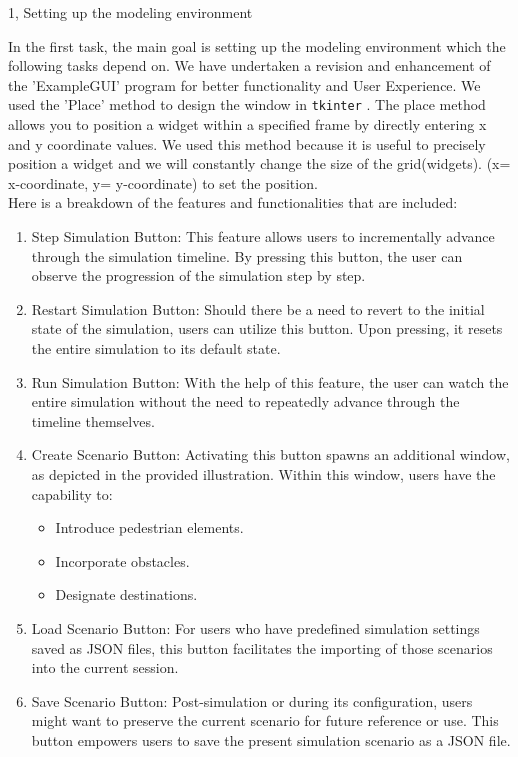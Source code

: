 \documentclass[10pt,a4paper]{article}
\begin{document}
\frontpage

\begin{task}{1, Setting up the modeling environment}

In the first task, the main goal is setting up the modeling environment which the following tasks depend on. 
We have undertaken a revision and enhancement of the 'ExampleGUI' program for better functionality and User Experience. 
We used the 'Place' method to design the window in \verb|tkinter| \cite{tkinter}. The place method allows you to position a widget within a specified frame by directly entering x and y coordinate values. We used this method because it is useful to precisely position a widget and we will constantly change the size of the grid(widgets). (x= x-coordinate, y= y-coordinate) to set the position.\\

Here is a breakdown of the features and functionalities that are included:

\begin{enumerate}
  \item Step Simulation Button: This feature allows users to incrementally advance through the simulation timeline. By pressing this button, the user can observe the progression of the simulation step by step.
  \item Restart Simulation Button: Should there be a need to revert to the initial state of the simulation, users can utilize this button. Upon pressing, it resets the entire simulation to its default state.
  \item Run Simulation Button: With the help of this feature, the user can watch the entire simulation without the need to repeatedly advance through the timeline themselves.  
  \item Create Scenario Button: Activating this button spawns an additional window, as depicted in the provided illustration. Within this window, users have the capability to:
  \begin{itemize}
      \item Introduce pedestrian elements.
      \item Incorporate obstacles.
      \item Designate destinations.
  \end{itemize}
  \item Load Scenario Button: For users who have predefined simulation settings saved as JSON files, this button facilitates the importing of those scenarios into the current session.
  \item Save Scenario Button: Post-simulation or during its configuration, users might want to preserve the current scenario for future reference or use. This button empowers users to save the present simulation scenario as a JSON file.
\end{enumerate}


\end{task}
\end{document}
